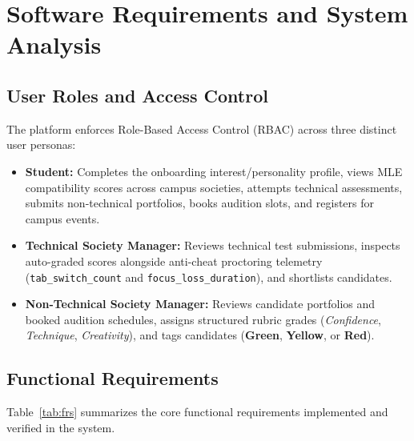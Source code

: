 \documentclass[12pt,a4paper]{report}
\begin{document}
\chapter{Software Requirements and System Analysis}

\section{User Roles and Access Control}
The platform enforces Role-Based Access Control (RBAC) across three distinct user personas:
\begin{itemize}[noitemsep]
    \item \textbf{Student:} Completes the onboarding interest/personality profile, views MLE compatibility scores across campus societies, attempts technical assessments, submits non-technical portfolios, books audition slots, and registers for campus events.
    \item \textbf{Technical Society Manager:} Reviews technical test submissions, inspects auto-graded scores alongside anti-cheat proctoring telemetry (\texttt{tab\_switch\_count} and \texttt{focus\_loss\_duration}), and shortlists candidates.
    \item \textbf{Non-Technical Society Manager:} Reviews candidate portfolios and booked audition schedules, assigns structured rubric grades (\textit{Confidence}, \textit{Technique}, \textit{Creativity}), and tags candidates (\textbf{Green}, \textbf{Yellow}, or \textbf{Red}).
\end{itemize}

\section{Functional Requirements}
Table~\ref{tab:frs} summarizes the core functional requirements implemented and verified in the system.
\end{document}
